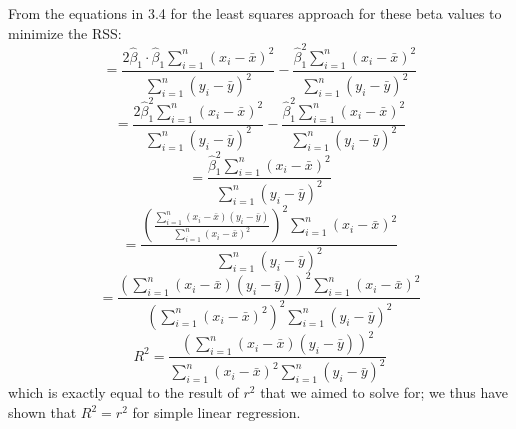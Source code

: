 \documentclass{article}
\begin{document}
{\[\]
From the equations in 3.4 for the least squares approach for these beta values to minimize the RSS:
\[
  = \frac{2 \hat{\beta}_1 \cdot \hat{\beta}_1 \sum_{i=1}^{n} (x_i - \bar{x})^2}{\sum_{i=1}^{n} (y_i - \bar{y})^2} - \frac{\hat{\beta}_1^2 \sum_{i=1}^{n} (x_i - \bar{x})^2}{\sum_{i=1}^{n} (y_i - \bar{y})^2}
\]
\[
  = \frac{2 \hat{\beta}_1^2 \sum_{i=1}^{n} (x_i - \bar{x})^2}{\sum_{i=1}^{n} (y_i - \bar{y})^2} - \frac{\hat{\beta}_1^2 \sum_{i=1}^{n} (x_i - \bar{x})^2}{\sum_{i=1}^{n} (y_i - \bar{y})^2}
\]
\[
  = \frac{\hat{\beta}_1^2 \sum_{i=1}^{n} (x_i - \bar{x})^2}{\sum_{i=1}^{n} (y_i - \bar{y})^2}
\]
\[
  = \frac{(\frac{\sum_{i=1}^{n} (x_i - \bar{x})(y_i - \bar{y})}{\sum_{i=1}^{n} (x_i - \bar{x})^2})^2 \sum_{i=1}^{n} (x_i - \bar{x})^2}{\sum_{i=1}^{n} (y_i - \bar{y})^2}
\]
\[
  = \frac{(\sum_{i=1}^{n} (x_i - \bar{x})(y_i - \bar{y}))^2 \sum_{i=1}^{n} (x_i - \bar{x})^2}{(\sum_{i=1}^{n} (x_i - \bar{x})^2)^2\sum_{i=1}^{n} (y_i - \bar{y})^2}
\]
\[
  R^2 = \frac{(\sum_{i=1}^{n} (x_i - \bar{x})(y_i - \bar{y}))^2 }{\sum_{i=1}^{n} (x_i - \bar{x})^2 \sum_{i=1}^{n} (y_i - \bar{y})^2}
\]
which is exactly equal to the result of \(r^2\) that we aimed to solve for; we thus have shown that \(R^2 = r^2\) for simple linear regression.

}
\end{document}
